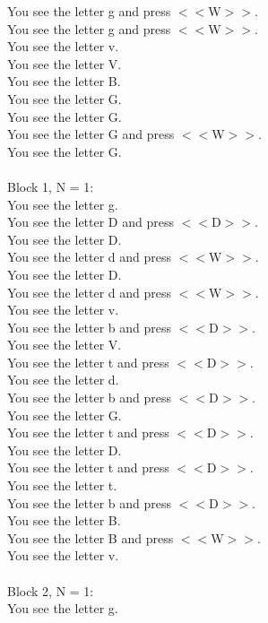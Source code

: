 \documentclass[pdflatex,sn-nature]{sn-jnl}%
\theoremstyle{thmstyleone}%
\theoremstyle{thmstyletwo}%
\theoremstyle{thmstylethree}%
\begin{document}
You see the letter g and press $<<$W$>>$. $~$\\ 
You see the letter g and press $<<$W$>>$. $~$\\ 
You see the letter v. $~$\\ 
You see the letter V. $~$\\ 
You see the letter B. $~$\\ 
You see the letter G. $~$\\ 
You see the letter G. $~$\\ 
You see the letter G and press $<<$W$>>$. $~$\\ 
You see the letter G. $~$\\ 
 $~$\\ 
Block 1, N = 1: $~$\\ 
You see the letter g. $~$\\ 
You see the letter D and press $<<$D$>>$. $~$\\ 
You see the letter D. $~$\\ 
You see the letter d and press $<<$W$>>$. $~$\\ 
You see the letter D. $~$\\ 
You see the letter d and press $<<$W$>>$. $~$\\ 
You see the letter v. $~$\\ 
You see the letter b and press $<<$D$>>$. $~$\\ 
You see the letter V. $~$\\ 
You see the letter t and press $<<$D$>>$. $~$\\ 
You see the letter d. $~$\\ 
You see the letter b and press $<<$D$>>$. $~$\\ 
You see the letter G. $~$\\ 
You see the letter t and press $<<$D$>>$. $~$\\ 
You see the letter D. $~$\\ 
You see the letter t and press $<<$D$>>$. $~$\\ 
You see the letter t. $~$\\ 
You see the letter b and press $<<$D$>>$. $~$\\ 
You see the letter B. $~$\\ 
You see the letter B and press $<<$W$>>$. $~$\\ 
You see the letter v. $~$\\ 
 $~$\\ 
Block 2, N = 1: $~$\\ 
You see the letter g. $~$\\ 
\end{document}
